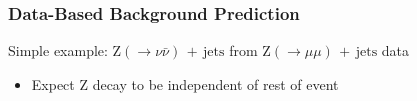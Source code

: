 \documentclass{beamer}
\begin{document}
\begin{frame}
  \frametitle{Data-Based Background Prediction}
  Simple example: $\text{Z}(\rightarrow\nu\bar{\nu})\,+\,\text{jets}$ from $\text{Z}(\rightarrow \mu\mu)\,+\,\text{jets}$ data
  \begin{itemize}
  \item Expect Z decay to be independent of rest of event
  \end{itemize}
  \begin{columns}
    \begin{column}{0.45\textwidth}
      \centering
    \end{column}
    \begin{column}{0.55\textwidth}
      \begin{block}{}

\end{block}
\end{column}
\end{columns}
\end{frame}
\end{document}
